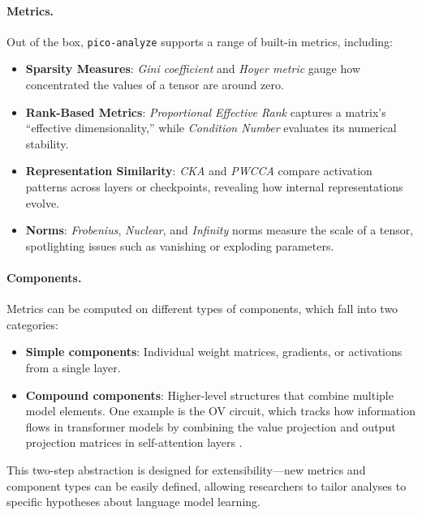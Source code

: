 \paragraph{Metrics.} Out of the box, \texttt{pico-analyze} supports a range of built-in metrics, including:
\begin{itemize}
    \item \textbf{Sparsity Measures}: \textit{Gini coefficient} \citep{hurley2009gini} and \textit{Hoyer metric} \citep{hoyer2004sparsity} gauge how concentrated the values of a tensor are around zero.

    \item \textbf{Rank-Based Metrics}: \textit{Proportional Effective Rank} \citep{diehlmartinez2024tending} captures a matrix’s “effective dimensionality,” while \textit{Condition Number} evaluates its numerical stability.

    \item \textbf{Representation Similarity}: \textit{CKA} \citep{kornblith2019cka} and \textit{PWCCA} \citep{morcos2018pwcca} compare activation patterns across layers or checkpoints, revealing how internal representations evolve.
    
    \item \textbf{Norms}: \textit{Frobenius}, \textit{Nuclear}, and \textit{Infinity} norms measure the scale of a tensor, spotlighting issues such as vanishing or exploding parameters.
\end{itemize}

\paragraph{Components.} Metrics can be computed on different types of components, which fall into two categories: 
\begin{itemize} 
\item \textbf{Simple components}: Individual weight matrices, gradients, or activations from a single layer. 
\item \textbf{Compound components}: Higher-level structures that combine multiple model elements. One example is the OV circuit, which tracks how information flows in transformer models by combining the value projection and output projection matrices in self-attention layers \cite{elhage2021mathematical}. 
\end{itemize}

This two-step abstraction is designed for extensibility—new metrics and component types can be easily defined, allowing researchers to tailor analyses to specific hypotheses about language model learning. 


